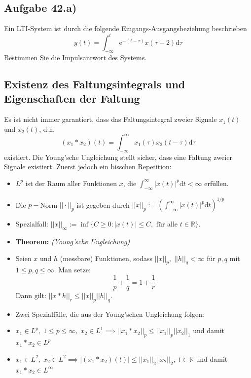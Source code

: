 \documentclass[11pt]{article}
\begin{document}
\vspace*{-0.5cm}
\subsection*{Aufgabe 42.a)}
\vspace*{-0.5cm}
Ein LTI-System ist durch die folgende Eingangs-Ausgangsbeziehung beschrieben
$$y(t) = \int_{-\infty}^t \text{e}^{-(t-\tau)}x(\tau-2)\text{d}\tau$$
Bestimmen Sie die Impulsantwort des Systems.


\pagebreak

\subsection*{Existenz des Faltungsintegrals und Eigenschaften der Faltung}
\vspace*{-0.5cm}
Es ist nicht immer garantiert, dass das Faltungsintegral zweier Signale $x_1(t)$ und $x_2(t)$, d.h. $$(x_1 \ast x_2)(t) = \int_{-\infty}^{\infty} x_1(\tau)x_2(t-\tau) \text{d}\tau$$ existiert. Die Young'sche Ungleichung stellt sicher, dass eine Faltung zweier Signale existiert. Zuerst jedoch ein bisschen Repetition:
\vspace*{-0.5cm}
\begin{itemize}[leftmargin = 0pt]
     \item[] $L^p$ ist der Raum aller Funktionen $x$, die $\displaystyle\int_{-\infty}^{\infty} |x(t)|^p \text{d}t < \infty$ erfüllen.
     \item[] Die $p-$Norm $||\cdot||_p$ ist gegeben durch $||x||_p := \left(\displaystyle\int_{-\infty}^{\infty} |x(t)|^p \text{d}t\right)^{1/p}$
     \item[] Spezialfall: $||x||_{\infty} := \inf\{C \geq 0: |x(t)| \leq C, \text{ für alle } t\in \mathbb{R}\}$.
     \item[] \textbf{Theorem:} \textit{(Young'sche Ungleichung)} 
     \item[] Seien $x$ und $h$ (messbare) Funktionen, sodass $||x||_p, \; ||h||_q < \infty$ für $p,q$ mit $1 \leq p,q \leq \infty$. Man setze:\\
     $$\frac{1}{p} + \frac{1}{q} = 1 + \frac{1}{r}$$
     Dann gilt: $||x \ast h||_r \leq ||x||_p||h||_q$.
     \item[] Zwei Spezialfälle, die aus der Young'schen Ungleichung folgen:
     \item[] $x_1 \in L^p, \; 1 \leq p \leq \infty, \; x_2 \in L^1 \implies ||x_1 \ast x_2 ||_p \leq ||x_1||_p ||x_2||_1$ und damit $x_1 \ast x_2 \in L^p$
     \item[] $x_1 \in L^2, \; x_2 \in L^2 \implies |(x_1 \ast x_2 )(t)| \leq ||x_1||_2 ||x_2||_2, \; t \in \mathbb{R}$ und damit $x_1 \ast x_2 \in L^\infty$
\end{itemize}
\end{document}
